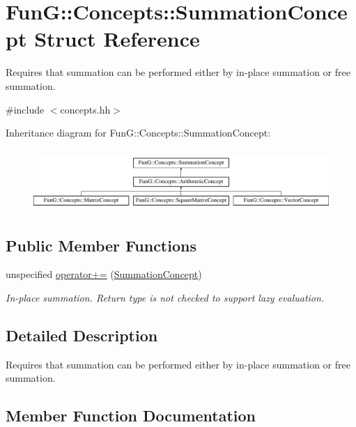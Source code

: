 \hypertarget{structFunG_1_1Concepts_1_1SummationConcept}{}\section{Fun\+G\+:\+:Concepts\+:\+:Summation\+Concept Struct Reference}
\label{structFunG_1_1Concepts_1_1SummationConcept}


Requires that summation can be performed either by in-\/place summation or free summation.  




{\ttfamily \#include $<$concepts.\+hh$>$}

Inheritance diagram for Fun\+G\+:\+:Concepts\+:\+:Summation\+Concept\+:\begin{figure}[H]
\begin{center}
\leavevmode
\includegraphics[height=2.352941cm]{structFunG_1_1Concepts_1_1SummationConcept}
\end{center}
\end{figure}
\subsection*{Public Member Functions}
\begin{DoxyCompactItemize}
\item 
unspecified \hyperlink{structFunG_1_1Concepts_1_1SummationConcept_aa8214ca88fddf74e3bc9e7dbfe2b606f}{operator+=} (\hyperlink{structFunG_1_1Concepts_1_1SummationConcept}{Summation\+Concept})
\begin{DoxyCompactList}\small\item\em In-\/place summation. Return type is not checked to support lazy evaluation. \end{DoxyCompactList}\end{DoxyCompactItemize}


\subsection{Detailed Description}
Requires that summation can be performed either by in-\/place summation or free summation. 

\subsection{Member Function Documentation}
\hypertarget{structFunG_1_1Concepts_1_1SummationConcept_aa8214ca88fddf74e3bc9e7dbfe2b606f}{}
